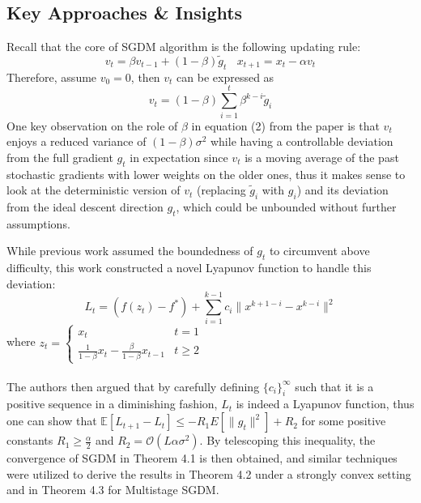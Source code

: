 \documentclass{article}
\begin{document}
\subsection{Key Approaches \& Insights}
Recall that the core of SGDM algorithm is the following updating rule:
\[
v_t = \beta v_{t - 1} + (1 - \beta)\tilde{g}_t \ \ \ \
x_{t + 1} = x_t - \alpha v_t
\]
Therefore, assume $v_0 = 0$, then $v_t$ can be expressed as 
\begin{equation}
v_t = (1 - \beta)\sum_{i = 1}^{t}\beta^{k - i}\tilde{g}_i
\end{equation}
One key observation on the role of $\beta$ in equation (2) from the paper is that $v_t$ enjoys a reduced variance of $(1 - \beta)\sigma^2$ while having a controllable deviation from the full gradient $g_t$ in expectation since $v_t$ is a moving average of the past stochastic gradients with lower weights on the older ones, thus it makes sense to look at the deterministic version of $v_t$ (replacing $\tilde{g}_i$ with $g_i$) and its deviation from the ideal descent direction $g_t$, which could be unbounded without further assumptions.

While previous work assumed the boundedness of $g_t$ to circumvent above difficulty, this work constructed a novel Lyapunov function to handle this deviation:
\begin{equation}
L_t = (f(z_t) - f^*) + \sum_{i = 1}^{k - 1}c_i\|x^{k + 1 - i} - x^{k - i}\|^2
\end{equation}
where $z_t = \begin{cases}
	x_t & t = 1 \\
	\frac{1}{1 - \beta}x_t - \frac{\beta}{1 - \beta}x_{t - 1} & t \geq 2
\end{cases}$\\
\ \\
The authors then argued that by carefully defining $\{c_i\}_i^\infty$ such that it is a positive sequence in a diminishing fashion, $L_t$ is indeed a Lyapunov function, thus one can show that $\mathbb{E}[L_{t + 1} - L_t] \leq -R_1E[\|g_t\|^2] + R_2$ for some positive constants $R_1 \geq \frac{\alpha}{2}$ and $R_2 = \mathcal{O}(L\alpha\sigma^2)$. By telescoping this inequality, the convergence of SGDM in Theorem 4.1 is then obtained, and similar techniques were utilized to derive the results in Theorem 4.2 under a strongly convex setting and in Theorem 4.3 for Multistage SGDM.
\end{document}

